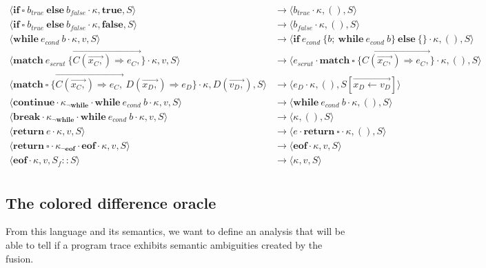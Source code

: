 \documentclass[a4paper,11pt]{article}
\newcommand\rtstate[3]{\langle #1, #2, #3\rangle}
\begin{document}
\begin{align*}
\rtstate{\mathbf{if}\ \square\ b_{true}\ \mathbf{else}\ b_{false} \cdot  \kappa}{\mathbf{true}}{S} &\rightarrow \rtstate{b_{true} \cdot \kappa}{()}{S}\\
\rtstate{\mathbf{if}\ \square\ b_{true}\ \mathbf{else}\ b_{false} \cdot  \kappa}{\mathbf{false}}{S} &\rightarrow \rtstate{b_{false} \cdot \kappa}{()}{S}\\
\rtstate{\mathbf{while}\ e_{cond}\ b \cdot \kappa}{v}{S} &\rightarrow \rtstate{\mathbf{if}\ e_{cond}\ \{ b;\ \mathbf{while}\ e_{cond}\ b \}\  \mathbf{else}\ \{\} \cdot \kappa}{()}{S}\\
\rtstate{\mathbf{match}\ e_{scrut}\ \{ \overrightarrow{C(\overrightarrow{x_C,}) \Rightarrow e_C,} \} \cdot \kappa}{v}{S} &\rightarrow \rtstate{e_{scrut} \cdot \mathbf{match}\ \square\ \{ \overrightarrow{C(\overrightarrow{x_C,}) \Rightarrow e_C,} \} \cdot \kappa}{()}{S}\\
\rtstate{\mathbf{match}\ \square\ \{ \overrightarrow{C(\overrightarrow{x_C,}) \Rightarrow e_C,}\ D(\overrightarrow{x_D,}) \Rightarrow e_D \} \cdot \kappa}{D(\overrightarrow{v_D,})}{S} &\rightarrow \rtstate{e_D \cdot \kappa}{()}{S[\overrightarrow{x_D \leftarrow v_D}]}\\
\rtstate{\mathbf{continue} \cdot \kappa_{\neg \textbf{while}} \cdot \textbf{while}\ e_{cond}\ b \cdot \kappa}{v}{S} &\rightarrow \rtstate{\textbf{while}\ e_{cond}\ b \cdot \kappa}{()}{S}\\
\rtstate{\mathbf{break} \cdot \kappa_{\neg \textbf{while}} \cdot \textbf{while}\ e_{cond}\ b \cdot \kappa}{v}{S} &\rightarrow \rtstate{\kappa}{()}{S}\\
\rtstate{\mathbf{return}\ e \cdot \kappa}{v}{S} &\rightarrow \rtstate{e \cdot \mathbf{return}\ \square \cdot \kappa}{()}{S}
\\
\rtstate{\mathbf{return}\ \square \cdot \kappa_{\neg \textbf{eof}} \cdot \textbf{eof} \cdot \kappa}{v}{S} &\rightarrow \rtstate{\textbf{eof} \cdot \kappa}{v}{S}\\
\rtstate{\textbf{eof} \cdot \kappa}{v}{S_f :: S} &\rightarrow \rtstate{\kappa}{v}{S}\\
\end{align*}

\subsection{The colored difference oracle}
\label{sec:colored-diff-oracle}
From this language and its semantics, we want to define an analysis that will be able to tell if a program trace exhibits semantic ambiguities created by the fusion.
\end{document}
